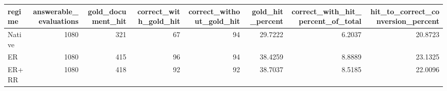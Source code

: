 \begin{tabular}{lrrrrrrr}
\toprule
regime & answerable_evaluations & gold_document_hit & correct_with_gold_hit & correct_without_gold_hit & gold_hit_percent & correct_with_hit_percent_of_total & hit_to_correct_conversion_percent \\
\midrule
Native & 1080 & 321 & 67 & 94 & 29.7222 & 6.2037 & 20.8723 \\
ER & 1080 & 415 & 96 & 94 & 38.4259 & 8.8889 & 23.1325 \\
ER+RR & 1080 & 418 & 92 & 92 & 38.7037 & 8.5185 & 22.0096 \\
\bottomrule
\end{tabular}
